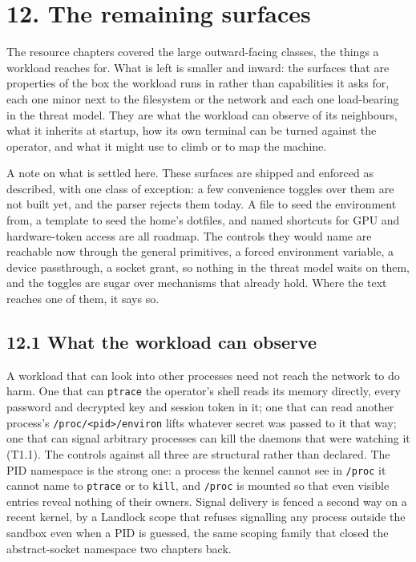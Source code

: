 \hypertarget{the-remaining-surfaces}{%
\chapter{12. The remaining surfaces}\label{the-remaining-surfaces}}

The resource chapters covered the large outward-facing classes, the
things a workload reaches for. What is left is smaller and inward: the
surfaces that are properties of the box the workload runs in rather than
capabilities it asks for, each one minor next to the filesystem or the
network and each one load-bearing in the threat model. They are what the
workload can observe of its neighbours, what it inherits at startup, how
its own terminal can be turned against the operator, and what it might
use to climb or to map the machine.

A note on what is settled here. These surfaces are shipped and enforced
as described, with one class of exception: a few convenience toggles
over them are not built yet, and the parser rejects them today. A file
to seed the environment from, a template to seed the home's dotfiles,
and named shortcuts for GPU and hardware-token access are all roadmap.
The controls they would name are reachable now through the general
primitives, a forced environment variable, a device passthrough, a
socket grant, so nothing in the threat model waits on them, and the
toggles are sugar over mechanisms that already hold. Where the text
reaches one of them, it says so.

\hypertarget{what-the-workload-can-observe}{%
\section{12.1 What the workload can
observe}\label{what-the-workload-can-observe}}

A workload that can look into other processes need not reach the network
to do harm. One that can \texttt{ptrace} the operator's shell reads its
memory directly, every password and decrypted key and session token in
it; one that can read another process's
\texttt{/proc/\textless{}pid\textgreater{}/environ} lifts whatever
secret was passed to it that way; one that can signal arbitrary
processes can kill the daemons that were watching it (T1.1). The
controls against all three are structural rather than declared. The PID
namespace is the strong one: a process the kennel cannot see in
\texttt{/proc} it cannot name to \texttt{ptrace} or to \texttt{kill},
and \texttt{/proc} is mounted so that even visible entries reveal
nothing of their owners. Signal delivery is fenced a second way on a
recent kernel, by a Landlock scope that refuses signalling any process
outside the sandbox even when a PID is guessed, the same scoping family
that closed the abstract-socket namespace two chapters back.

